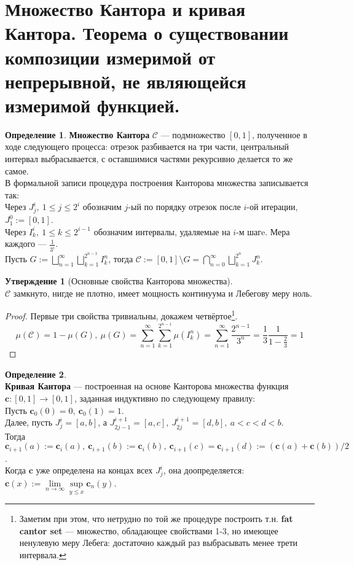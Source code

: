 \documentclass[11pt,a4paper]{report}
\def\cantor{\mathcal{C}}
\theoremstyle{definition}
\theoremstyle{definition}
\newtheorem{preposition}{Утверждение}[section]
\theoremstyle{definition}
\newtheorem{definition}{Определение}[section]
\begin{document}
	\section{Множество Кантора и кривая Кантора. Теорема о существовании композиции измеримой от непрерывной, не являющейся измеримой функцией.}
	\begin{definition}
		\textbf{Множество Кантора} $ \mathcal{C} $ — подмножество $ [0, 1] $, полученное в ходе следующего процесса: отрезок разбивается на три части, центральный интервал выбрасывается, с оставшимися частями рекурсивно делается то же самое.\\
		В формальной записи процедура построения Канторова множества записывается так:\\
		Через $ J^{i}_{j},\ 1 \le j \le 2^{i} $ обозначим $ j $-ый по порядку отрезок после $ i $-ой итерации, $ J^{0}_{1} := [0, 1] $.\\
		Через $ I^{i}_{k},\ 1 \le k \le 2^{i-1} $ обозначим интервалы, удаляемые на $ i $-м шагe. Мера каждого — $ \frac{1}{3^{i}} $.\\
		Пусть $ G := \bigsqcup\limits_{n=1}^{\infty}\bigsqcup\limits_{k=1}^{2^{n-1}}{I^{n}_{k}} $, тогда $ \cantor := [0, 1] \setminus G = \bigcap\limits_{n=0}^{\infty}\bigsqcup\limits_{k=1}^{2^{n}}{J^{n}_{k}} $.
	\end{definition}
	\begin{preposition}[Основные свойства Канторова множества]$  $\\
		$ \cantor $ замкнуто, нигде не плотно, имеет мощность континуума и Лебегову меру ноль.
	\end{preposition}
	\begin{proof}
		Первые три свойства тривиальны, докажем четвёртое\footnote{Заметим при этом, что нетрудно по той же процедуре построить т.н. \textbf{fat cantor set} — множество, обладающее свойствами 1-3, но имеющее ненулевую меру Лебега: достаточно каждый раз выбрасывать менее трети интервала.}.\\
		\[ \mu(\cantor) = 1 - \mu(G),\ \mu(G) = \sum_{n=1}^{\infty}{ \sum_{k=1}^{2^{n-1}}{ \mu(I^{n}_{k}) } } = \sum_{n=1}^{\infty}{ \frac{2^{n-1}}{3^{n}}  } = \frac{1}{3} \frac{1}{1-\frac{2}{3}} = 1 \]
	\end{proof}
	\begin{definition}$  $\\
		\textbf{Кривая Кантора} — построенная на основе Канторова множества функция $ \mathbf{c}: [0, 1] \to [0, 1] $, заданная индуктивно по следующему правилу:\\
		Пусть $ \mathbf{c}_{0}(0) = 0,\ \mathbf{c}_{0}(1) = 1 $.\\
		Далее, пусть $ J^{i}_{j} = [a, b]  $, а $ J^{i+1}_{2j-1} = [a, c],\ J^{i+1}_{2j} = [d, b],\ a < c < d < b $.\\
		Тогда $ \mathbf{c}_{i+1}(a) := \mathbf{c}_{i}(a),\ \mathbf{c}_{i+1}(b) := \mathbf{c}_{i}(b),\ \mathbf{c}_{i + 1}(c) = \mathbf{c}_{i+1}(d) := (\mathbf{c}(a) + \mathbf{c}(b))/2 $.\\
		Когда $ \mathbf{c} $ уже определена на концах всех $ J^{i}_{j} $, она доопределяется: $ \mathbf{c}(x) := \lim\limits_{n\to\infty}{\sup\limits_{y \le x} \mathbf{c}_{n}(y)} $.
	\end{definition}
\end{document}
